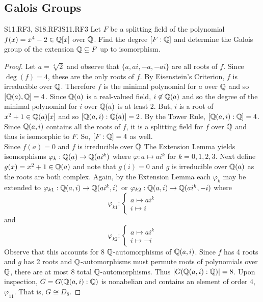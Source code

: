 \documentclass[../AlgebraQualSolutions.tex]{subfiles}
\begin{document}
\subsection{Galois Groups}

\begin{prob}{S11.RF3, S18.RF3}{S11.RF3}
    Let $F$ be a splitting field of the polynomial $f(x) = x^4 - 2 \in \mathbb{Q}[x]$ over $\mathbb{Q}$. Find the degree $[F: \mathbb{Q}]$ and determine the Galois group of the extension $\mathbb{Q} \subseteq F$ up to isomorphism.
\end{prob}

\begin{proof}
    Let $a = \sqrt[4]{2}$ and  observe that $\{a,ai,-a,-ai\}$ are all roots of $f$. Since $\deg(f) = 4$, these are the only roots of $f$. By Eisenstein's Criterion, $f$ is irreducible over $\mathbb{Q}$. Therefore $f$ is the minimal polynomial for $a$ over $\mathbb{Q}$ and so $[\mathbb{Q}(a),\mathbb{Q}] = 4$. Since $\mathbb{Q}(a)$ is a real-valued field, $i \not\in \mathbb{Q}(a)$ and so the degree of the minimal polynomial for $i$ over $\mathbb{Q}(a)$ is at least 2. But, $i$ is a root of $x^2 + 1 \in \mathbb{Q}(a)[x]$ and so $[\mathbb{Q}(a,i): \mathbb{Q}(a)] = 2$. By the Tower Rule, $[\mathbb{Q}(a,i): \mathbb{Q}] = 4$. Since $\mathbb{Q}(a,i)$ contains all the roots of $f$, it is a splitting field for $f$ over $\mathbb{Q}$ and thus is isomorphic to $F$. So, $[F: \mathbb{Q}] = 4$ as well.\\

    Since $f(a) = 0$ and $f$ is irreducible over $\mathbb{Q}$ The Extension Lemma yields isomorphisms $\varphi_k: \mathbb{Q}(a) \to \mathbb{Q}(ai^k)$ where $\varphi:a \mapsto ai^k$ for $k = 0,1,2,3$. Next define $g(x) = x^2 + 1 \in \mathbb{Q}(a)$ and note that $g(i) = 0$ and $g$ is irreducible over $\mathbb{Q}(a)$ as the roots are both complex. Again, by the Extension Lemma each $\varphi_k$ may be extended to $\varphi_{k1}: \mathbb{Q}(a,i) \to \mathbb{Q}(ai^k, i)$ or $\varphi_{k2}: \mathbb{Q}(a,i) \to \mathbb{Q}(ai^k,-i)$ where
        \[\varphi_{k1}: \begin{cases}
            a \mapsto ai^k\\
            i \mapsto i
        \end{cases}\]
    and
        \[\varphi_{k2}: \begin{cases}
        a \mapsto ai^k\\
        i \mapsto -i
    \end{cases}\]
    Observe that this accounts for 8 $\mathbb{Q}$-automorphisms of $\mathbb{Q}(a,i)$. Since $f$ has 4 roots and $g$ has 2 roots and $\mathbb{Q}$-automorphisms must permute roots of polynomials over $\mathbb{Q}$, there are at most 8 total $\mathbb{Q}$-automorphisms. Thus $|G(\mathbb{Q}(a,i): \mathbb{Q})| = 8$. Upon inspection, $G = G(\mathbb{Q}(a,i): \mathbb{Q})$ is nonabelian and contains an element of order 4, $\varphi_{11}$. That is, $G \cong D_8$. 
\end{proof}
\end{document}
